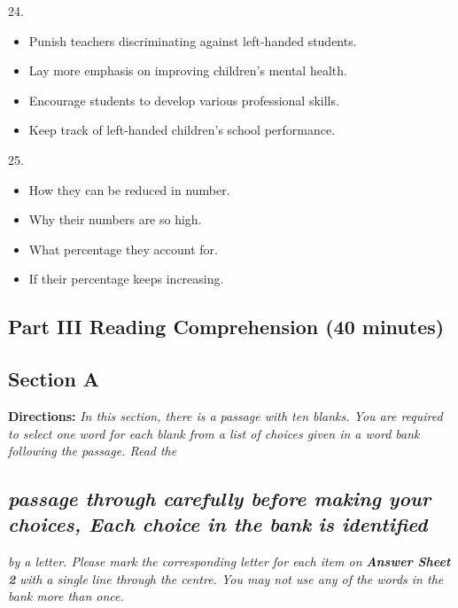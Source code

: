 \documentclass[UTF8,11pt]{ctexart}
\begin{document}
24.


\begin{itemize}[leftmargin=2em,itemsep=.2em,topsep=.4em]\item[A.] Punish teachers discriminating against left-handed students.
\item[B.] Lay more emphasis on improving children's mental health.
\item[C.] Encourage students to develop various professional skills.
\item[D.] Keep track of left-handed children's school performance.
\end{itemize}

25.


\begin{itemize}[leftmargin=2em,itemsep=.2em,topsep=.4em]\item[A.] How they can be reduced in number.
\item[B.] Why their numbers are so high.
\item[C.] What percentage they account for.
\item[D.] If their percentage keeps increasing.
\end{itemize}

\subsection*{\textbf{Part }III \textbf{Reading Comprehension} \textbf{(40 minutes)}}


\subsection*{\textbf{Section A}}


\textbf{Directions: }\textit{In this section, there is a passage with ten blanks. You are required to select one} \textit{word for each blank from a list of choices given in a word bank following the passage. Read the}


\subsection*{\textit{passage through carefully before making your choices, Each choice in the bank} \textit{is identified}}


\textit{by a letter. Please mark the corresponding letter for each item on }\textbf{\textit{Answer Sheet 2 }}\textit{with a single} \textit{line through the centre. You may not use any of the words in the bank more than once.}
\end{document}
